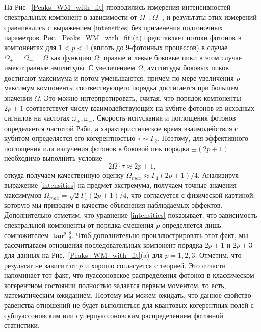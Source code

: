 На Рис.~\ref{Peaks_WM_with_fit} проводились измерения интенсивностей спектральных компонент в зависимости от $\Omega_-, \Omega_+$, и результаты этих измерений сравнивались с выражением \eqref{intensities} без применения подгоночных параметров. Рис.~\ref{Peaks_WM_with_fit}(a) представляет потоки фотонов в компонентах для  $1< p < 4$ (вплоть до 9-фотонных процессов) в случае $\Omega_+\!=\!\Omega_-\!=\!\Omega$ как функцию $\Omega$: правые и левые боковые пики в этом случае имеют равные амплитуды. С увеличением $\Omega$, амплитуды боковых пиков достигают максимума и потом уменьшаются, причем по мере увеличения $p$ максимум компоненты соотвествующего порядка достигается при большем значении $\Omega$. Это можно интерпретировать, считая, что порядок компоненты $2p + 1$ соответствует числу взаимодействующих на кубите фотонов из исходных сигналов на частотах $\omega_+, \omega_-$. Скорость испускания и поглощения фотонов определяется частотой Раби, а характеристическое время взаимодействия с кубитом определяется его когерентностью $\tau \sim \Gamma_2$. Поэтому, для эффективного поглощения или излучения фотонов в боковой пик порядка $\pm(2p+1)$ необходимо выполнить условие
\begin{equation}
2\Omega\cdot \tau \approx 2p+1,
\end{equation}
откуда получаем качественную оценку $\Omega_{max} \approx \Gamma_1(2p+1)/4$. Анализируя выражение \eqref{intensities} на предмет экстремума, получаем точные значения максимумов $\Omega_{max} = \sqrt{2} \Gamma_1(2p+1)/4$, что согласуется с физической картиной, которую мы приводим в качестве объяснения наблюдаемых эффектов. Дополнительно отметим, что уравнение \eqref{intensities} показывает, что зависимость спектральной компоненты от порядка смешения $p$ определяется лишь сомножителем $\tan^p\frac{\theta}{2}$. Чтоб дополнительно проиллюстрировать этот факт, мы рассчитываем отношения последовательных компонент порядка $2p+1$ и $2p+3$ для данных на Рис.~\ref{Peaks_WM_with_fit}(a) для $p=1,2,3$. Отметим, что результат не зависит от $p$ и хорошо согласуется с теорией. Это отчасти напоминает тот факт, что пуассоновское распределения фотонов в классическом когерентном состоянии полностью задается первым моментом, то есть, математическим ожиданием. Поэтому мы можем ожидать, что данное свойство равенства отношений не будет выполняться для квантовых когерентных полей с субпуассоновским или суперпуассоновским распределением фотонной статистики. 

